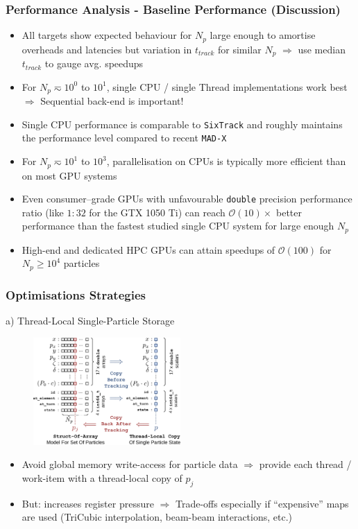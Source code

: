 \documentclass{beamer}
\begin{document}
\begin{frame}
    \frametitle{Performance Analysis - Baseline Performance (Discussion)}
    \begin{itemize}
        \item All targets show expected behaviour for $N_p$ large enough to amortise overheads and latencies but variation in $t_{track}$ for similar $N_p$ $\Rightarrow$ use median $t_{track}$ to gauge avg. speedups
        \item For $N_p \eqsim 10^0$ to $10^1$, single CPU / single Thread implementations work best $\Rightarrow$ Sequential back-end is important!
        \item Single CPU performance is comparable to \texttt{SixTrack} and roughly maintains the performance level compared to recent \texttt{MAD-X}\cite{perssonMADXFutureColliders2021}
        \item For $N_p \eqsim 10^1$ to $10^3$, parallelisation on CPUs is typically more efficient than on most GPU systems
        \item Even consumer--grade GPUs with unfavourable \texttt{double} precision performance ratio (like $1:32$ for the GTX 1050 Ti) can reach
              $\mathcal{O}(10) \times$ better performance than the fastest studied single CPU system for large enough $N_p$
        \item High-end and dedicated HPC GPUs can attain speedups of $\mathcal{O}(100)$ for $N_p \geq 10^4$ particles
    \end{itemize}
\end{frame}

\begin{frame}
    \frametitle{Optimisations Strategies}
    {a) Thread-Local Single-Particle Storage}\\[0.4em]
    \begin{figure}[H]
        \centering
        \includegraphics[width=0.5\textwidth]{poster_images/fig_particle_model_optimisation}
    \end{figure}
    \begin{itemize}
        \item Avoid global memory write-access for particle data $\Rightarrow$ provide each thread / work-item
           with a thread-local copy of $p_j$
        \item {\color{MyDarkRed}But:} increases register pressure $\Rightarrow$ Trade-offs especially if ``expensive'' maps are used (TriCubic interpolation, beam-beam interactions, etc.)
    \end{itemize}
\end{frame}
\end{document}
